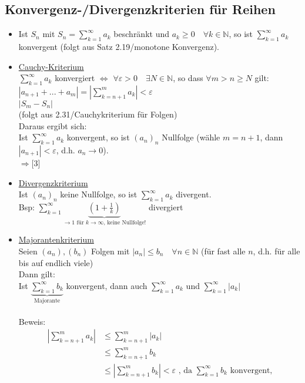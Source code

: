 \documentclass[12pt, titlepage]{article}
\newcommand{\N}{\mathds{N}}
\renewcommand{\*}{\cdot}
\renewcommand{\epsilon}{\varepsilon}
\begin{document}
	\subsection{Konvergenz-/Divergenzkriterien für Reihen}
	\begin{itemize}
		\item[\fbox{1}] Ist $S_n$ mit $S_n=\sum_{k=1}^{\infty}a_k$ beschränkt und $a_k\geq 0\quad\forall k\in\N$, so ist $\sum_{k=1}^{\infty}a_k$ konvergent (folgt aus Satz 2.19/monotone Konvergenz).
		\item[\fbox{2}] \underline{Cauchy-Kriterium}\\
		$\sum_{k=1}^{\infty}a_k$ konvergiert $\Leftrightarrow$ $\forall\epsilon>0\quad\exists N\in\N$, so dass $\forall m>n\geq N$ gilt: $|a_{n+1}+...+a_m|=|\sum_{k=n+1}^{m}a_k|<\epsilon$\\
		$|S_m-S_n|$\\
		(folgt aus 2.31/Cauchykriterium für Folgen)\\
		Daraus ergibt sich:\\
		Ist $\sum_{k=1}^{\infty}a_k$ konvergent, so ist $(a_n)_n$ Nullfolge (wähle $m=n+1$, dann $|a_{n+1}|<\epsilon$, d.h. $a_n\rightarrow0$).\\
		$\Rightarrow$[3]
		\item[\fbox{3}] \underline{Divergenzkriterium}\\
		Ist $(a_n)_n$ keine Nullfolge, so ist $\sum_{k=1}^{\infty}a_k$ divergent.\\
		Bsp: $\sum_{k=1}^{\infty}\underbrace{(1+\frac{1}{k})}_{\rightarrow1\textrm{ für }k\rightarrow\infty\textrm{, keine Nullfolge!}}$ divergiert
		\item[\fbox{4}] \underline{Majorantenkriterium}\\
		Seien $(a_n),(b_n)$ Folgen mit $|a_n|\leq b_n\quad\forall n\in\N$ (für fast alle $n$, d.h. für alle bis auf endlich viele)\\
		Dann gilt:\\
		Ist $\underbrace{\sum_{k=1}^{\infty}b_k}_{\textrm{Majorante}}$ konvergent, dann auch $\sum_{k=1}^{\infty}a_k$ und $\sum_{k=1}^{\infty}|a_k|$\\
		\\
		Beweis:
		\begin{align*}
			|\sum_{k=n+1}^{m}a_k|&\leq\sum_{k=n+1}^{m}|a_k|\\
			&\leq\sum_{k=n+1}^{m}b_k\\
			&\leq|\sum_{k=n+1}^{m}b_k|<\epsilon\textrm{ , da }\sum_{k=1}^{\infty}b_k\textrm{ konvergent,}
		\end{align*}

\end{itemize}
\end{document}
